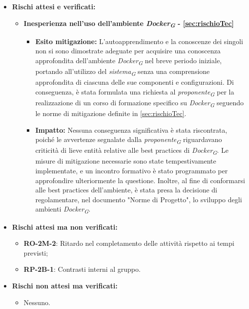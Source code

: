 \begin{itemize}
    \item \textbf{Rischi attesi e verificati:}
\begin{itemize}
    \item \textbf{Inesperienza nell'uso dell'ambiente \textit{Docker}\textsubscript{\textit{G}} - \ref{sec:rischioTec}}
    \begin{itemize}
        \item \textbf{Esito mitigazione:} 
            L'autoapprendimento e la conoscenze dei singoli non si sono dimostrate adeguate per acquisire una conoscenza approfondita dell'ambiente \textit{Docker}\textsubscript{\textit{G}} nel breve periodo iniziale, portando all'utilizzo del \textit{sistema}\textsubscript{\textit{G}} senza una comprensione approfondita di ciascuna delle sue componenti e configurazioni. Di conseguenza, è stata formulata una richiesta al \textit{proponente}\textsubscript{\textit{G}} per la realizzazione di un corso di formazione specifico su \textit{Docker}\textsubscript{\textit{G}} seguendo le norme di mitigazione definite in \ref{sec:rischioTec}.
        \item \textbf{Impatto:}
            Nessuna conseguenza significativa è stata riscontrata, poiché le avvertenze segnalate dalla \textit{proponente}\textsubscript{\textit{G}} riguardavano criticità di lieve entità relative alle best practices di \textit{Docker}\textsubscript{\textit{G}}. Le misure di mitigazione necessarie sono state tempestivamente implementate, e un incontro formativo è stato programmato per approfondire ulteriormente la questione.
            Inoltre, al fine di conformarsi alle best practices dell'ambiente, è stata presa la decisione di regolamentare, nel documento "Norme di Progetto", lo sviluppo degli ambienti \textit{Docker}\textsubscript{\textit{G}}.
    \end{itemize}
\end{itemize}
\item \textbf{Rischi attesi ma non verificati:}
 \begin{itemize}
    \item \textbf{RO-2M-2}: Ritardo nel completamento delle attività rispetto ai tempi previsti;
    \item \textbf{RP-2B-1}: Contrasti interni al gruppo.
\end{itemize}
\item \textbf{Rischi non attesi ma verificati:}
\begin{itemize}
    \item Nessuno.
\end{itemize}
\end{itemize}

